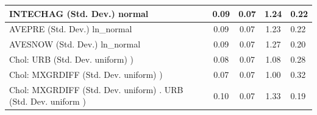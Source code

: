 \begin{table}
\begin{center}
\begin{tabular}{|l|l|c|c|c|l|}
			\hline
			INTECHAG (Std. Dev.) normal &  & 0.09 & 0.07 & 1.24 & 0.22 \\
			\hline
			AVEPRE (Std. Dev.) ln_normal &  & 0.09 & 0.07 & 1.23 & 0.22 \\
			\hline
			AVESNOW (Std. Dev.) ln_normal &  & 0.09 & 0.07 & 1.27 & 0.20 \\
			\hline
			 Chol: URB (Std. Dev. uniform) ) &  & 0.08 & 0.07 & 1.08 & 0.28 \\
			\hline
			 Chol: MXGRDIFF (Std. Dev. uniform) ) &  & 0.07 & 0.07 & 1.00 & 0.32 \\
			\hline
			 Chol: MXGRDIFF (Std. Dev. uniform) . URB (Std. Dev.   uniform ) &  & 0.10 & 0.07 & 1.33 & 0.19 \\
			\hline
		\end{tabular}
	\end{center}
\end{table}